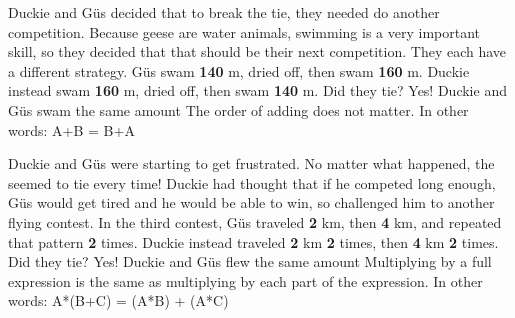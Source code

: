 {Duckie and Güs decided that to break the tie, they needed do another competition. \linebreak Because geese are water animals, swimming is a very important skill, so they decided that that should be their next competition. They each have a different strategy. Güs swam \textbf{140} m, dried off, then swam \textbf{160} m. Duckie instead swam \textbf{160} m, dried off, then swam \textbf{140} m. Did they tie?}
{Yes! Duckie and Güs swam the same amount}
{The order of adding does not matter. In other words: A+B = B+A}
{}
{Duckie and Güs were starting to get frustrated. No matter what happened, the seemed to tie every time! Duckie had thought that if he competed long enough, Güs would get tired and he would be able to win, so challenged him to another flying contest. In the third contest, Güs traveled \textbf{2} km, then \textbf{4} km, and repeated that pattern \textbf{2} times. Duckie instead traveled \textbf{2} km \textbf{2} times, then \textbf{4} km \textbf{2} times. Did they tie?}
{Yes! Duckie and Güs flew the same amount}
{Multiplying by a full expression is the same as multiplying by each part of the expression. In other words: A*(B+C) = (A*B) + (A*C)}
